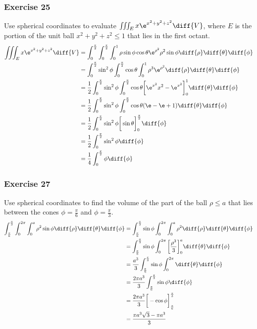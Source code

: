 \documentclass{math}
\begin{document}
\subsubsection*{Exercise 25}
Use spherical coordinates to evaluate \( \iiint_{E}x\e^{x^2+y^2+z^2}\diff{V} \),
where \( E \) is the portion of the unit ball \( x^2+y^2+z^2\le1 \) that lies in
the first octant.
\begin{align*}
  \iiint_{E}x\e^{x^2+y^2+z^2}\diff{V} &=
    \int_{0}^{\frac{\pi}{2}}\int_{0}^{\frac{\pi}{2}}\int_{0}^{1}
    \rho\sin\phi\cos\theta\e^{\rho^2}\rho^2\sin\phi
    \diff{\rho}\diff{\theta}\diff{\phi} \\
  &= \int_{0}^{\frac{\pi}{2}}\sin^2\phi\int_{0}^{\frac{\pi}{2}}\cos\theta
    \int_{0}^{1}\rho^3\e^{\rho^2}\diff{\rho}\diff{\theta}\diff{\phi} \\
  &= \frac{1}{2}\int_{0}^{\frac{\pi}{2}}\sin^2\phi
    \int_{0}^{\frac{\pi}{2}}\cos\theta
    \bigg[\e^{x^2}x^2-\e^{x^2}\bigg]_{0}^{1}\diff{\theta}\diff{\phi} \\
  &= \frac{1}{2}\int_{0}^{\frac{\pi}{2}}\sin^2\phi
    \int_{0}^{\frac{\pi}{2}}\cos\theta(\e-\e+1)\diff{\theta}\diff{\phi} \\
  &= \frac{1}{2}\int_{0}^{\frac{\pi}{2}}\sin^2\phi
    \bigg[\sin\theta\bigg]_{0}^{\frac{\pi}{2}}\diff{\phi} \\
  &= \frac{1}{2}\int_{0}^{\frac{\pi}{2}}\sin^2\phi\diff{\phi} \\
  &= \frac{1}{4}\int_{0}^{\frac{\pi}{2}}\phi\diff{\phi} \\
\end{align*}

\subsubsection*{Exercise 27}
Use spherical coordinates to find the volume of the part of the ball \( \rho\le
a \) that lies between the cones \( \phi = \frac{\pi}{6} \) and \( \phi =
\frac{\pi}{3} \).
\begin{align*}
  \int_{\frac{\pi}{6}}^{\frac{\pi}{3}}\int_{0}^{2\pi}\int_{0}^{a}\rho^2\sin\phi
    \diff{\rho}\diff{\theta}\diff{\phi} &=
    \int_{\frac{\pi}{6}}^{\frac{\pi}{3}}\sin\phi\int_{0}^{2\pi}
    \int_{0}^{a}\rho^2\diff{\rho}\diff{\theta}\diff{\phi} \\
  &= \int_{\frac{\pi}{6}}^{\frac{\pi}{3}}\sin\phi\int_{0}^{2\pi}
    \bigg[\frac{\rho^3}{3}\bigg]_{0}^{a}\diff{\theta}\diff{\phi} \\
  &= \frac{a^3}{3}\int_{\frac{\pi}{6}}^{\frac{\pi}{3}}\sin\phi\int_{0}^{2\pi}
    \diff{\theta}\diff{\phi} \\
  &= \frac{2\pi a^3}{3}
    \int_{\frac{\pi}{6}}^{\frac{\pi}{3}}\sin\phi\diff{\phi} \\
  &= \frac{2\pi a^3}{3}\bigg[-\cos\phi\bigg]_{\frac{\pi}{6}}^{\frac{\pi}{3}} \\
  &= \frac{\pi a^3\sqrt{3}-\pi a^3}{3}
\end{align*}
\end{document}

